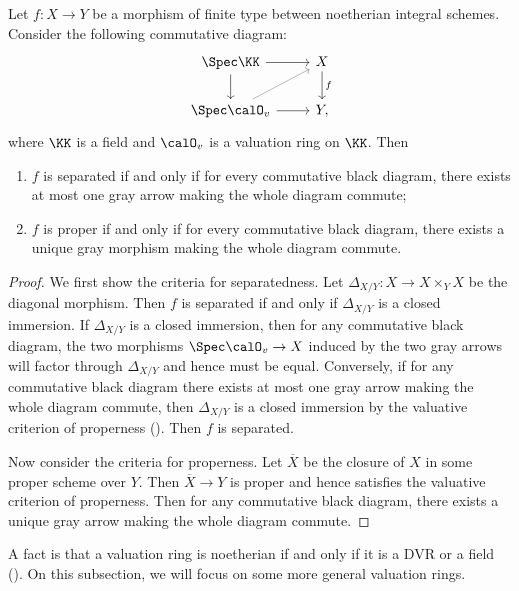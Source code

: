 \begin{theorem}
	Let $f: X \to Y$ be a morphism of finite type between noetherian integral schemes.
	Consider the following commutative diagram:
	\[ \begin{tikzcd}
			\Spec \KK \ar[r] \ar[d] & X \ar[d, "f"] \\
			\Spec \calO_v \ar[r] \ar[ru, gray] & Y,
		\end{tikzcd} \]
	where $\KK$ is a field and $\calO_v$ is a valuation ring on $\KK$.
	Then
	\begin{enumerate}
		\item $f$ is separated if and only if for every commutative black diagram, there exists at most one gray arrow making the whole diagram commute;
		\item $f$ is proper if and only if for every commutative black diagram, there exists a unique gray morphism making the whole diagram commute.
	\end{enumerate}
	\Yang{}
\end{theorem}
\begin{proof}
	We first show the criteria for separatedness.
	Let $\Delta_{X/Y}: X \to X \times_Y X$ be the diagonal morphism.
	Then $f$ is separated if and only if $\Delta_{X/Y}$ is a closed immersion.
	If $\Delta_{X/Y}$ is a closed immersion, then for any commutative black diagram, the two morphisms $\Spec \calO_v \to X$ induced by the two gray arrows will factor through $\Delta_{X/Y}$ and hence must be equal.
	Conversely, if for any commutative black diagram there exists at most one gray arrow making the whole diagram commute, then $\Delta_{X/Y}$ is a closed immersion by the valuative criterion of properness (\cite[\href{https://stacks.math.columbia.edu/tag/0BX4}{Tag 0BX4}]{Stacks}).
	Then $f$ is separated.

	Now consider the criteria for properness.
	Let $\overline{X}$ be the closure of $X$ in some proper scheme over $Y$.
	Then $\overline{X} \to Y$ is proper and hence satisfies the valuative criterion of properness.
	Then for any commutative black diagram, there exists a unique gray arrow making the whole diagram commute.



\end{proof}

A fact is that a valuation ring is noetherian if and only if it is a DVR or a field (\cite[\href{https://stacks.math.columbia.edu/tag/00II}{Tag 00II}]{Stacks}).
On this subsection, we will focus on some more general valuation rings.

